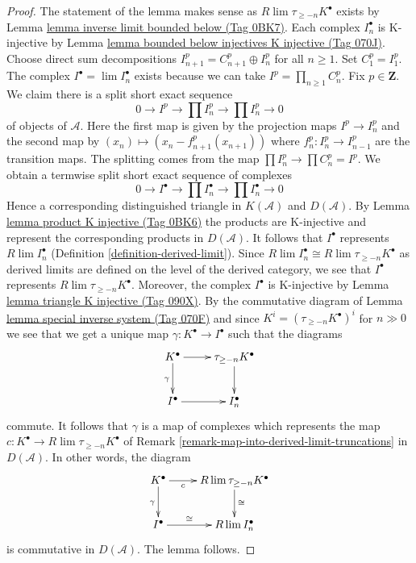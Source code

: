 \documentclass{amsart}
\theoremstyle{plain}
\theoremstyle{definition}
\theoremstyle{remark}
\numberwithin{equation}{subsection}
\def\lim{\mathop{\mathrm{lim}}\nolimits}
\begin{document}
\begin{proof}
The statement of the lemma makes sense as $R\lim \tau_{\geq -n}K^\bullet$
exists by Lemma \href{https://stacks.math.columbia.edu/tag/0BK7}{lemma inverse limit bounded below (Tag 0BK7)}.
Each complex $I_n^\bullet$ is K-injective by
Lemma \href{https://stacks.math.columbia.edu/tag/070J}{lemma bounded below injectives K injective (Tag 070J)}.
Choose direct sum decompositions $I_{n + 1}^p = C_{n + 1}^p \oplus I_n^p$
for all $n \geq 1$. Set $C_1^p = I_1^p$. The complex
$I^\bullet = \lim I_n^\bullet$ exists because we can take
$I^p = \prod_{n \geq 1} C_n^p$. Fix $p \in \mathbf{Z}$.
We claim there is a split short exact sequence
$$
0 \to I^p \to \prod I_n^p \to \prod I_n^p \to 0
$$
of objects of $\mathcal{A}$. Here the first map is given by
the projection maps $I^p \to I_n^p$ and the second map
by $(x_n) \mapsto (x_n - f^p_{n + 1}(x_{n + 1}))$ where
$f^p_n : I_n^p \to I_{n - 1}^p$ are the transition maps.
The splitting comes from the map $\prod I_n^p \to \prod C_n^p = I^p$.
We obtain a termwise split short exact sequence of complexes
$$
0 \to I^\bullet \to \prod I_n^\bullet \to \prod I_n^\bullet \to 0
$$
Hence a corresponding distinguished triangle in $K(\mathcal{A})$
and $D(\mathcal{A})$. By Lemma \href{https://stacks.math.columbia.edu/tag/0BK6}{lemma product K injective (Tag 0BK6)}
the products are K-injective and represent the corresponding
products in $D(\mathcal{A})$.
It follows that $I^\bullet$ represents $R\lim I_n^\bullet$
(Definition \ref{definition-derived-limit}).
Since $R\lim I_n^\bullet \cong R\lim \tau_{\geq -n}K^\bullet$
as derived limits are defined on the level of the derived
category, we see that $I^\bullet$ represents $R\lim \tau_{\geq -n}K^\bullet$.
Moreover, the complex $I^\bullet$ is K-injective by
Lemma \href{https://stacks.math.columbia.edu/tag/090X}{lemma triangle K injective (Tag 090X)}.
By the commutative diagram of Lemma \href{https://stacks.math.columbia.edu/tag/070F}{lemma special inverse system (Tag 070F)}
and since $K^i = (\tau_{\geq -n}K^\bullet)^i$
for $n \gg 0$ we see that we get a unique map
$\gamma : K^\bullet \to I^\bullet$ such that the diagrams
$$
\xymatrix{
K^\bullet \ar[r] \ar[d]_\gamma & \tau_{\geq -n} K^\bullet \ar[d] \\
I^\bullet \ar[r] & I_n^\bullet
}
$$
commute. It follows that $\gamma$ is a map of complexes which represents
the map $c : K^\bullet \to R\lim \tau_{\geq -n}K^\bullet$ of
Remark \ref{remark-map-into-derived-limit-truncations}
in $D(\mathcal{A})$. In other words, the diagram
$$
\xymatrix{
K^\bullet \ar[r]_-c \ar[d]_\gamma & R\lim \tau_{\geq -n} K^\bullet
\ar[d]^{\cong} \\
I^\bullet \ar[r]^-{\cong} & R\lim I_n^\bullet
}
$$
is commutative in $D(\mathcal{A})$. The lemma follows.
\end{proof}
\end{document}
